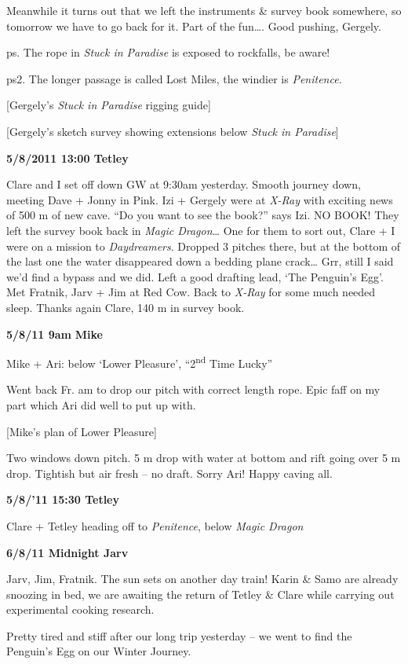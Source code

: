 Meanwhile it turns out that we left the instruments \& survey book
somewhere, so tomorrow we have to go back for it. Part of the
fun\ldots{}. Good pushing, Gergely.

ps. The rope in \emph{Stuck in Paradise} is exposed to rockfalls, be
aware!

ps2. The longer passage is called Lost Miles, the windier is
\emph{Penitence}.

{[}Gergely's \emph{Stuck in Paradise} rigging guide{]}

{[}Gergely's sketch survey showing extensions below \emph{Stuck in
Paradise}{]}

\textbf{5/8/2011 13:00 Tetley}

Clare and I set off down GW at 9:30am yesterday. Smooth journey down,
meeting Dave + Jonny in Pink. Izi + Gergely were at \emph{X-Ray} with
exciting news of 500 m of new cave. ``Do you want to see the book?''
says Izi. NO BOOK! They left the survey book back in \emph{Magic
Dragon}\ldots{} One for them to sort out, Clare + I were on a mission to
\emph{Daydreamers}. Dropped 3 pitches there, but at the bottom of the
last one the water disappeared down a bedding plane crack\ldots{} Grr,
still I said we'd find a bypass and we did. Left a good drafting lead,
`The Penguin's Egg'. Met Fratnik, Jarv + Jim at Red Cow. Back to
\emph{X-Ray} for some much needed sleep. Thanks again Clare, 140 m in
survey book.

\textbf{5/8/11 9am} \textbf{Mike}

Mike + Ari: below `Lower Pleasure', ``2\textsuperscript{nd} Time Lucky''

Went back Fr. am to drop our pitch with correct length rope. Epic faff
on my part which Ari did well to put up with.

{[}Mike's plan of Lower Pleasure{]}

Two windows down pitch. 5 m drop with water at bottom and rift going
over 5 m drop. Tightish but air fresh -- no draft. Sorry Ari! Happy
caving all.

\textbf{5/8/'11 15:30 Tetley}

Clare + Tetley heading off to \emph{Penitence}, below \emph{Magic
Dragon}

\textbf{6/8/11 Midnight Jarv}

Jarv, Jim, Fratnik. The sun sets on another day train! Karin \& Samo are
already snoozing in bed, we are awaiting the return of Tetley \& Clare
while carrying out experimental cooking research.

Pretty tired and stiff after our long trip yesterday -- we went to find
the Penguin's Egg on our Winter Journey.

